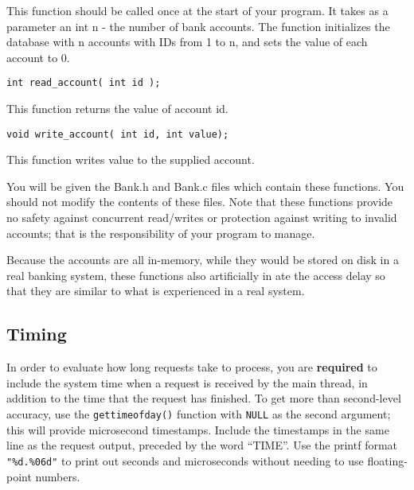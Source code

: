 \documentclass[letterpaper,10pt]{article}
\begin{document}
This function should be called once at the start of your program. It takes as a parameter an int n - the
number of bank accounts. The function initializes the database with n accounts with IDs from 1 to n,
and sets the value of each account to 0.
\begin{verbatim}
int read_account( int id );
\end{verbatim}

This function returns the value of account id.
\begin{verbatim}
void write_account( int id, int value);
\end{verbatim}

This function writes value to the supplied account.

You will be given the Bank.h and Bank.c files which contain these functions. You should not modify
the contents of these files. Note that these functions provide no safety against concurrent read/writes or
protection against writing to invalid accounts; that is the responsibility of your program to manage.

Because the accounts are all in-memory, while they would be stored on disk in a real banking system,
these functions also artificially in
ate the access delay so that they are similar to what is experienced in
a real system.



\subsection{Timing}
In order to evaluate how long requests take to process, you are \textbf{required} to include
the system time when a request is received by the main thread, in addition to the
time that the request has finished. To get more than second-level accuracy, use
the \verb+gettimeofday()+ function with \verb+NULL+ as the second argument; this
will provide microsecond timestamps. Include the timestamps in the same line as the
request output, preceded by the word ``TIME''. Use the printf format \verb+"%d.%06d"+
to print out seconds and microseconds without needing to use floating-point numbers.
\end{document}
